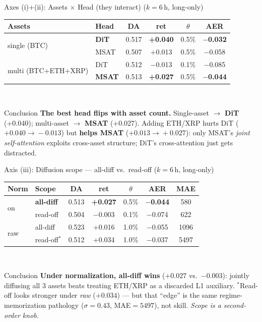 \documentclass[10pt,aspectratio=169]{beamer}
\newcommand{\gd}[1]{\textbf{\textcolor{good}{#1}}}
\newcommand{\bd}[1]{\textcolor{bad}{#1}}
\begin{document}
\begin{frame}{Axes (i)+(ii): Assets $\times$ Head \quad(they interact) \hfill\normalfont\small($k{=}6$\,h, long-only)}
\centering\small
\setlength{\tabcolsep}{7pt}
\begin{tabular}{@{}ll cc c c@{}}
\toprule
Assets & Head & DA & ret & $\theta$ & AER \\ \midrule
\multirow{2}{*}{single (BTC)}
 & \gd{DiT}  & 0.517 & \gd{+0.040} & 0.5\% & \gd{$-$0.032} \\
 & MSAT      & 0.507 & +0.013 & 0.5\% & $-$0.058 \\ \midrule
\multirow{2}{*}{multi (BTC+ETH+XRP)}
 & DiT       & 0.512 & \bd{$-$0.013} & 0.1\% & $-$0.085 \\
 & \gd{MSAT} & 0.513 & \gd{+0.027} & 0.5\% & \gd{$-$0.044} \\
\bottomrule
\end{tabular}
\\[1em]
\begin{block}{Conclusion}
\footnotesize
\textbf{The best head flips with asset count.} Single-asset $\rightarrow$ \gd{DiT} (+0.040);
multi-asset $\rightarrow$ \gd{MSAT} (+0.027).
Adding ETH/XRP \bd{hurts DiT} ($+0.040\!\to\!-0.013$) but \gd{helps MSAT} ($+0.013\!\to\!+0.027$):
only MSAT's \emph{joint self-attention} exploits cross-asset structure; DiT's cross-attention just
gets distracted.
\end{block}
\end{frame}

\begin{frame}{Axis (iii): Diffusion scope --- all-diff vs.\ read-off \hfill\normalfont\small($k{=}6$\,h, long-only)}
\centering\small
\setlength{\tabcolsep}{7pt}
\begin{tabular}{@{}ll cc c cc@{}}
\toprule
Norm & Scope & DA & ret & $\theta$ & AER & MAE \\ \midrule
\multirow{2}{*}{on}
 & \gd{all-diff} & 0.513 & \gd{+0.027} & 0.5\% & \gd{$-$0.044} & 580 \\
 & read-off      & 0.504 & $-$0.003 & 0.1\% & $-$0.074 & 622 \\ \midrule
\multirow{2}{*}{raw}
 & all-diff      & 0.523 & +0.016 & 1.0\% & $-$0.055 & 1096 \\
 & read-off$^\ast$ & 0.512 & +0.034 & 1.0\% & $-$0.037 & \bd{5497} \\
\bottomrule
\end{tabular}
\\[1em]
\begin{block}{Conclusion}
\footnotesize
\textbf{Under normalization, all-diff wins} ($+0.027$ vs.\ $-0.003$): jointly diffusing all 3 assets
beats treating ETH/XRP as a discarded L1 auxiliary.
$^\ast$Read-off looks stronger under \emph{raw} ($+0.034$) --- but that ``edge'' is the same
regime-memorization pathology (\bd{$\sigma{=}0.43$, MAE${=}5497$}), not skill. \emph{Scope is a
second-order knob.}
\end{block}
\end{frame}
\end{document}
